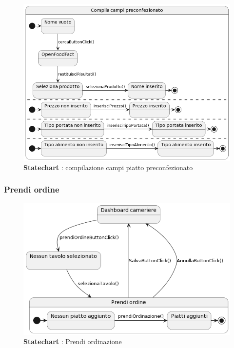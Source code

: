         \begin{figure}[H]
            \centering
            \includegraphics[scale=0.6]{assets/diagrammi/Statechart/compilaCampiPreconfezionato.png}
            \caption*{\textbf{Statechart} : compilazione campi piatto preconfezionato}\label{fig:Statechart_fieldPlate2}
        \end{figure}

    \subsubsection{Prendi ordine}
        \begin{figure}[H]
            \centering
            \includegraphics[scale=0.7]{assets/diagrammi/Statechart/prendiOrdine.png}
            \caption*{\textbf{Statechart} : Prendi ordinazione}\label{fig:Statechart_takeOrder}
        \end{figure}

